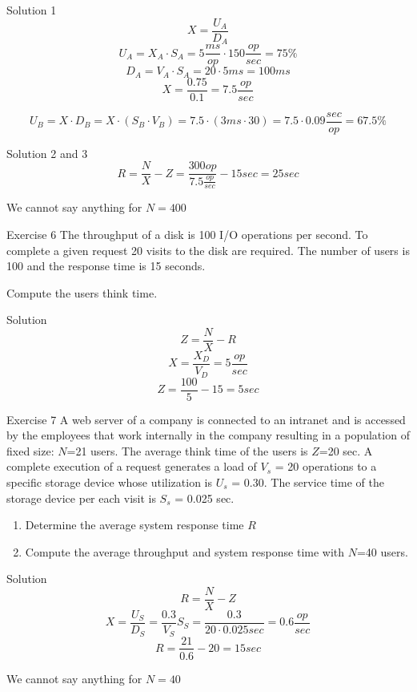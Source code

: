 \documentclass[]{beamer}
\begin{document}
\begin{frame}{Solution 1}
$$X = \frac{U_A}{D_A}$$
$$U_A = X_A \cdot S_A = 5 \frac{ms}{op} \cdot 150 \frac{op}{sec} = 75\%$$
$$D_A = V_A \cdot S_A = 20 \cdot 5ms = 100ms$$
$$X = \frac{0.75}{0.1} = 7.5\frac{op}{sec}$$

$$U_B = X \cdot D_B = X \cdot (S_B \cdot V_B) = 7.5 \cdot (3ms \cdot 30) = 7.5 \cdot 0.09 \frac{sec}{op} = 67.5\%$$
\end{frame}

\begin{frame}{Solution 2 and 3}
$$R = \frac{N}{X}-Z = \frac{300 op}{7.5 \frac{op}{sec}} -15 sec = 25 sec$$

\vspace{2cm}
We cannot say anything for $N=400$
\end{frame}


\begin{frame}{Exercise 6}
The throughput of a disk is 100 I/O operations per second. To complete a given request 20 visits to the disk
are required. The number of users is 100 and the response time is 15 seconds.

Compute the users think time.
\end{frame}

\begin{frame}{Solution}
$$Z = \frac{N}{X}-R$$
$$X = \frac{X_D}{V_D} = 5 \frac{op}{sec}$$
$$Z = \frac{100}{5} - 15 = 5 sec$$
\end{frame}

\begin{frame}{Exercise 7}
A web server of a company is connected to an intranet and is accessed by the employees that work
internally in the company resulting in a population of fixed size: $N$=21 users. The average think time of the
users is $Z$=20 sec. A complete execution of a request generates a load of $V_s$ = 20 operations to a specific
storage device whose utilization is $U_s$ = 0.30. The service time of the storage device per each visit is $S_s$ = 0.025
sec.

\begin{enumerate}
\item Determine the average system response time $R$
\item Compute the average throughput and system response time with $N$=40 users.
\end{enumerate}
\end{frame}

\begin{frame}{Solution}
$$R = \frac{N}{X} - Z$$
$$X = \frac{U_S}{D_S} = \frac{0.3}{V_S}{S_S} = \frac{0.3}{20 \cdot 0.025 sec} = 0.6 \frac{op}{sec}$$
$$R = \frac{21}{0.6} - 20 = 15 sec$$

We cannot say anything for $N=40$ 
\end{frame}
\end{document}

